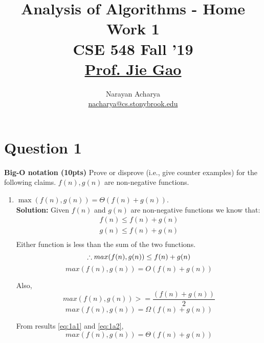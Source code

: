 \documentclass[11pt]{article}
\title{%
	Analysis of Algorithms - Home Work 1\\[2mm]
	\large CSE 548 Fall '19\\[1mm]
	\href{mailto:jgao@cs.stonybrook.edu}{Prof. Jie Gao}
}
\author{%
	Narayan Acharya \\[1mm] \small \href{mailto:nacharya@cs.stonybrook.edu}{nacharya@cs.stonybrook.edu
	}
}
\date{\vspace{-5ex}}
\begin{document}
\maketitle
\thispagestyle{fancy} %

\section{Question 1}

\textbf{Big-O notation (10pts)} Prove or disprove (i.e., give counter examples) for the following claims. $f(n), g(n)$ are non-negative functions.
    \begin{enumerate}
    \item $\max(f(n), g(n))=\Theta(f(n)+g(n))$. \\
    \textbf{Solution:}
    Given $f(n)$ and $g(n)$ are non-negative functions we know that:
    \begin{equation*}
    \begin{split}
	    f(n) \le f(n) + g(n) \\
	    g(n) \le f(n) + g(n) \\
	\end{split}
    \end{equation*}
    Either function is less than the sum of the two functions.
    \begin{equation*} 
    \therefore max(f(n), g(n)) \le f(n) + g(n) \\
    \end{equation*}
    \begin{equation} \label{eq:1a1}
        \boxed{max(f(n), g(n)) = O(f(n)+g(n))}
    \end{equation}
    
    Also,
    \begin{equation*}
		max(f(n), g(n)) >= \frac{(f(n)+g(n))}{2}
    \end{equation*}
    \begin{equation} \label{eq:1a2}
	    \boxed{max(f(n), g(n)) = \Omega(f(n)+g(n))}
    \end{equation}
    
    From results \ref{eq:1a1} and \ref{eq:1a2},
    \begin{equation*}
	    \boxed{max(f(n), g(n)) = \Theta(f(n)+g(n))}
    \end{equation*}
    

\end{enumerate}
\end{document}
